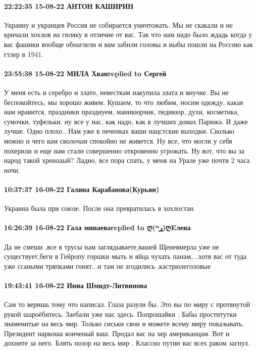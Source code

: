 \paragraph{22:22:35 15-08-22 АНТОН КАШИРИН}

Украину и укранцев Россия не собирается уничтожать. Мы не скакали и не кричали
хохлов на гиляку в отличие от вас. Так что нам надо было ждадь когда у вас
фашики вообще обнаглели и вам забили головы и выбы пошли на Россию как гтлер в
1941.

\paragraph{23:55:38 15-08-22 МИЛА Хванreplied to Сергей}

У меня есть и серебро и злато, невесткам накупила злата и внучке. Вы не
беспокойтесь, мы хорошо живем. Кушаем, то что любим, носим одежду, какая нам
нравится, праздники празднуем, маникюрчик, педикюр, духи, косметика, сумочки,
туфельки, ну все у нас, как надо, как в лучших домах Парижа. И даже лучше. Одно
плохо.. Нам уже в печенках ваши нацстские выходки. Сколько можно и чего вам
сволочам спокойно не живется. Ну все, что могли у себя похерили и еще нам стали
совершенно откровенно угрожать. Ну вот, что вы за народ такой хреноаый? Ладно,
все пора спать, у меня на Урале уже почти 2 часа ночи.

\paragraph{10:37:37 16-08-22 Галина Карабанова(Курьян)}

Украина была при союзе. После она превратилась в хохлостан

\paragraph{16:26:39 16-08-22 Гала минаеваreplied to ღ(ړײ)ღEлена}

Да не смеши ,все в трусы нам заглядываете,вашей Щеневмерла уже не
существует,беги в Гейропу горшки мыть и яйца чухать панам,...хотя вас от туда
уже ссаными тряпками гонят...и там не згодились ,кастрюлеголовые

\paragraph{19:43:41 16-08-22 Инна Шмидт-Литвинова}

Сам то веришь тому что написал. Глаза разули бы. Это вы по миру с протянутой
рукой шароёбитесь. Заебали уже нас здесь. Попрошайки . Бабы проститутки
знаменитые на весь мир. Только сиськи свои и можете всему миру показывать.
Президент наркоша конченый ваш. Продал вас на хер американцам. Вот и дохните за
него. Блять позор на весь мир . Классно путин вас всех раком загнул.

